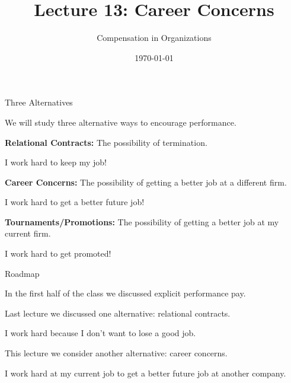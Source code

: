 \documentclass[aspectratio=169,usenames,dvipsnames]{beamer}
\title[diss]{Lecture 13: Career Concerns} %
\author{Compensation in Organizations} %
\institute[shortinst]{Jacob Kohlhepp}
\date{\today} %
\newenvironment{wideitemize}{\itemize\addtolength{\itemsep}{10pt}}{\enditemize}
\begin{document}
\begin{frame}
\titlepage %

\end{frame}


\begin{frame}{Three Alternatives}

\begin{wideitemize}
    \item We will study three alternative ways to encourage performance.
    \item \textbf{Relational Contracts:} The possibility of termination.
    \begin{wideitemize}
        \item I work hard to keep my job!
    \end{wideitemize}
    \item \textbf{Career Concerns:} The possibility of getting a better job at a different firm.
    \begin{wideitemize}
        \item I work hard to get a better future job!
    \end{wideitemize}
    \item \textbf{Tournaments/Promotions:} The possibility of getting a better job at my current firm.
    \begin{wideitemize}
        \item I work hard to get promoted!
    \end{wideitemize}
\end{wideitemize}
    
\end{frame}

\begin{frame}{Roadmap}
\begin{wideitemize}
    \item In the first half of the class we discussed explicit performance pay.
    \item Last lecture we discussed one alternative: relational contracts.
    \item I work hard because I don't want to lose a good job.
    \item This lecture we consider another alternative: career concerns.
    \item I work hard at my current job to get a better future job at another company.
\end{wideitemize}
    
\end{frame}
\end{document}
